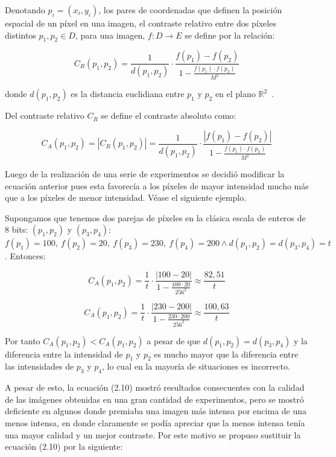 Denotando $p_i =(x_i ,y_i )$, los pares de coordenadas que definen la posición espacial de un píxel en una imagen, el contraste relativo entre dos píxeles distintos $p_1, p_2 \in D$, para una imagen, $f : D \to E$ se define por la relación:

\begin{equation}
	C_R(p_1,p_2)=\frac{1}{d(p_1,p_2)}\cdot\frac{f(p_1)-f(p_2)}{1-\frac{f(p_1)\cdot f(p_2)}{M^2}}
\end{equation}

donde $d(p_1 ,p_2 )$ es la distancia euclidiana entre $p_1$ y $p_2$ en el plano $\mathbb{R}^2$~\cite{patrascu2014mathematical}.

Del contraste relativo $C_R$ se define el contraste absoluto como:

\begin{equation}
	C_A(p_1,p_2)=|C_R(p_1,p_2)|=\frac{1}{d(p_1,p_2)}\cdot\frac{|f(p_1)-f(p_2)|}{1-\frac{f(p_1)\cdot f(p_2)}{M^2}}
\end{equation}

Luego de la realizaci\'on de una serie de experimentos se decidi\'o modificar la ecuaci\'on anterior pues esta favorec\'ia a los p\'ixeles de mayor intensidad mucho m\'as que a los p\'ixeles de menor intensidad. V\'ease el siguiente ejemplo.

Supongamos que tenemos dos parejas de p\'ixeles en la cl\'asica escala de enteros de 8 bits: $(p_1,p_2)$ y $(p_3,p_4)$: $f(p_1)=100,~f(p_2)=20,~f(p_3)=230,~f(p_4)=200 \land d(p_1,p_2)=d(p_3,p_4)=t$. Entonces:

\begin{equation}
	C_A(p_1,p_2)=\frac{1}{t}\cdot\frac{|100-20|}{1-\frac{100\cdot20}{256^2}}\approx\frac{82,51}{t}
\end{equation} 

\begin{equation}
	C_A(p_1,p_2)=\frac{1}{t}\cdot\frac{|230-200|}{1-\frac{230\cdot200}{256^2}}\approx\frac{100,63}{t}
\end{equation}

Por tanto $C_A(p_1,p_2)<C_A(p_1,p_2)$ a pesar de que $d(p_1,p_2)=d(p_3,p_4)$ y la diferencia entre la intensidad de $p_1$ y $p_2$ es mucho mayor que la diferencia entre las intensidades de $p_3$ y $p_4$, lo cual en la mayor\'ia de situaciones es incorrecto.

A pesar de esto, la ecuaci\'on (2.10) mostr\'o resultados consecuentes con la calidad de las im\'agenes obtenidas en una gran cantidad de experimentos, pero se mostr\'o deficiente en algunos donde premiaba una imagen m\'as intensa por encima de una menos intensa, en donde claramente se pod\'ia apreciar que la menos intensa ten\'ia una mayor calidad y un mejor contraste. Por este motivo se propuso sustituir la ecuaci\'on (2.10) por la siguiente:

